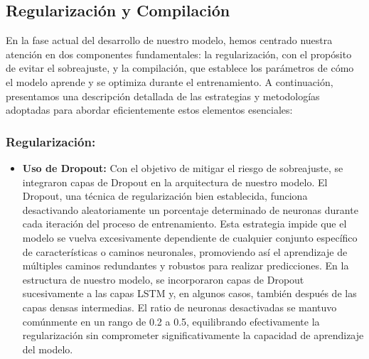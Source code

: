 \subsection{Regularización y Compilación}
En la fase actual del desarrollo de nuestro modelo, hemos centrado nuestra atención en dos componentes fundamentales: la regularización, con el propósito de evitar el sobreajuste, y la compilación, que establece los parámetros de cómo el modelo aprende y se optimiza durante el entrenamiento. A continuación, presentamos una descripción detallada de las estrategias y metodologías adoptadas para abordar eficientemente estos elementos esenciales:

\subsubsection{Regularización:} 
\begin{itemize}
    \item \textbf{Uso de Dropout:} Con el objetivo de mitigar el riesgo de sobreajuste, se integraron capas de Dropout en la arquitectura de nuestro modelo. El Dropout, una técnica de regularización bien establecida, funciona desactivando aleatoriamente un porcentaje determinado de neuronas durante cada iteración del proceso de entrenamiento. Esta estrategia impide que el modelo se vuelva excesivamente dependiente de cualquier conjunto específico de características o caminos neuronales, promoviendo así el aprendizaje de múltiples caminos redundantes y robustos para realizar predicciones. En la estructura de nuestro modelo, se incorporaron capas de Dropout sucesivamente a las capas LSTM y, en algunos casos, también después de las capas densas intermedias. El ratio de neuronas desactivadas se mantuvo comúnmente en un rango de 0.2 a 0.5, equilibrando efectivamente la regularización sin comprometer significativamente la capacidad de aprendizaje del modelo.
\end{itemize}

